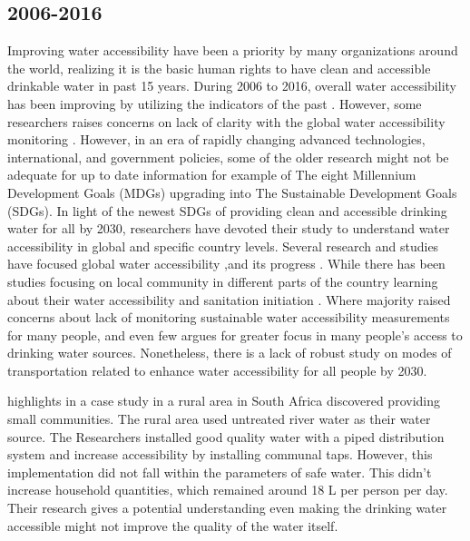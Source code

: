 \documentclass[10pt,twoside]{article}
\numberwithin{equation}{section}
\newcommand{\?}{\stackrel{?}{=}}
\begin{document}
\subsection{2006-2016}
Improving water accessibility have been a priority by many organizations around the world, realizing it is the basic human rights to have clean and accessible drinkable water in past 15 years. During 2006 to 2016, overall water accessibility has been improving by utilizing the indicators of the past \citep{fullerTrackingProgressGlobal2016}. However, some researchers raises concerns on lack of clarity with the global water accessibility monitoring \citep{ondaGlobalAccessSafe2012, jiaHighResolutionSpatialDistribution2016}. However, in an era of rapidly changing advanced technologies, international, and government policies, some of the older research might not be adequate for up to date information for  example of The eight Millennium Development Goals (MDGs) upgrading into The Sustainable Development Goals (SDGs). In light of the newest SDGs of providing clean and accessible drinking water for all by 2030, researchers have devoted their study to understand water accessibility in global and specific country levels. Several research and studies have focused global water accessibility ,and its progress \citep{sorensonSafeAccessSafe2011,bainAccountingWaterQuality2012,wssccWaterSanitationHygiene2014,  ondaGlobalAccessSafe2012, bartramGlobalMonitoringWater2014, ondaCountryClusteringApplied2014, whoDrinkingwater,fullerTrackingProgressGlobal2016, weiyuyuGlobalPerspectiveDrinkingwater2016, grahamAnalysisWaterCollection2016,overboOnplotDrinkingWater2016}. While there has been studies focusing on local community in different parts of the country learning about their water accessibility and sanitation initiation \citep{jagalsDoesImprovedAccess2006, geereDomesticWaterCarrying2010, simaWaterFlowsEnergy2013, hoChallengeGlobalWater2014, sakisakaIntroductionCommunityWater2015, jiaHighResolutionSpatialDistribution2016}. Where majority raised concerns about lack of monitoring sustainable water accessibility measurements for many people, and even few argues for greater focus in many people's access to drinking water sources. Nonetheless, there is a lack of robust study on modes of transportation related to enhance water accessibility for all people by 2030.      


\citet{jagalsDoesImprovedAccess2006} highlights in a case study in a rural area in South Africa discovered providing small communities. The rural area used untreated river water as their water source. The Researchers installed good quality water with a piped distribution system and increase accessibility by installing communal taps. However, this implementation did not fall within the parameters of safe water. This didn't increase household quantities, which remained around 18 L per person per day. Their research
gives a potential understanding even making the drinking water accessible might not improve the quality of the water
itself.
\end{document}
